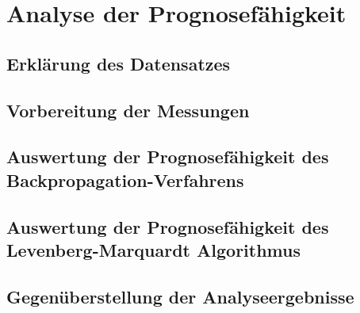 

\section{Analyse der Prognosefähigkeit}\label{sec:analyse}

\subsection{Erklärung des Datensatzes}\label{sec:datensatz}

\subsection{Vorbereitung der Messungen}

\subsection{Auswertung der Prognosefähigkeit des Backpropagation-Verfahrens}\label{sec:aus_backprop}

\subsection{Auswertung der Prognosefähigkeit des Levenberg-Marquardt Algorithmus}\label{sec:aus_LM}

\subsection{Gegenüberstellung der Analyseergebnisse}\label{sec:geg_aus_alg}
